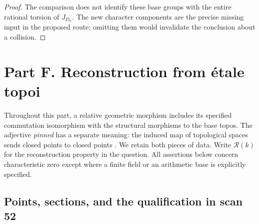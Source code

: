 \documentclass[11pt]{article}
\begin{document}
\begin{proof}
The comparison does not identify these base groups
with the entire rational torsion of $J_{D_n}$. The
new character components are the precise missing
input in the proposed route; omitting them would
invalidate the conclusion about a collision.
\end{proof}

\section{Part F. Reconstruction from \'etale topoi}
\label{sec:FF}

Throughout this part, a relative geometric morphism includes its specified
commutation isomorphism with the structural morphisms to the base topos.
The adjective \emph{pinned} has a separate meaning: the induced map of
topological spaces sends closed points to closed points
\citep[Definition~2.19]{FF_CHW2024}. We retain both pieces of data.
Write \(\mathcal R(k)\) for the reconstruction property in the question.
All assertions below concern characteristic zero except where a
finite field or an arithmetic base is explicitly specified.

\subsection{Points, sections, and the qualification in scan 52}
\end{document}
